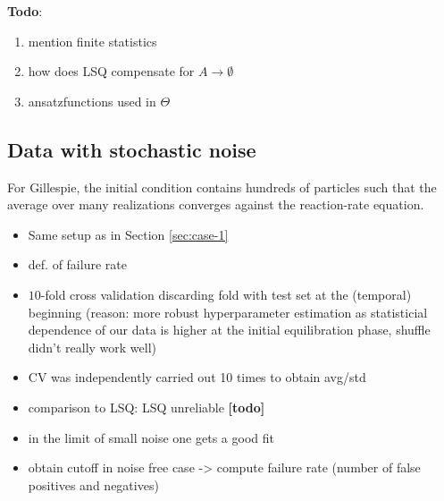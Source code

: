 \documentclass[oneside, abstracton, titlepage]{scrartcl}
\begin{document}
	\textbf{Todo}:
	\begin{enumerate}
		\item mention finite statistics
		\item how does LSQ compensate for $A\to\emptyset$
		\item ansatzfunctions used in $\Theta$
	\end{enumerate}
	
	\subsection{Data with stochastic noise}\label{sec:case-2}
	For Gillespie, the initial condition contains hundreds of particles such that the average over many realizations converges against the reaction-rate equation.
	
	\begin{itemize}
		\item Same setup as in Section \ref{sec:case-1}
		\item def. of failure rate
		\item $10$-fold cross validation discarding fold with test set at the (temporal) beginning (reason: more robust hyperparameter estimation as statisticial dependence of our data is higher at the initial equilibration phase, shuffle didn't really work well)
		\item CV was independently carried out 10 times to obtain avg/std
		\item comparison to LSQ: LSQ unreliable \textbf{[todo]}
		\item in the limit of small noise one gets a good fit
		\item obtain cutoff in noise free case -> compute failure rate (number of false positives and negatives)
	\end{itemize}
\end{document}
